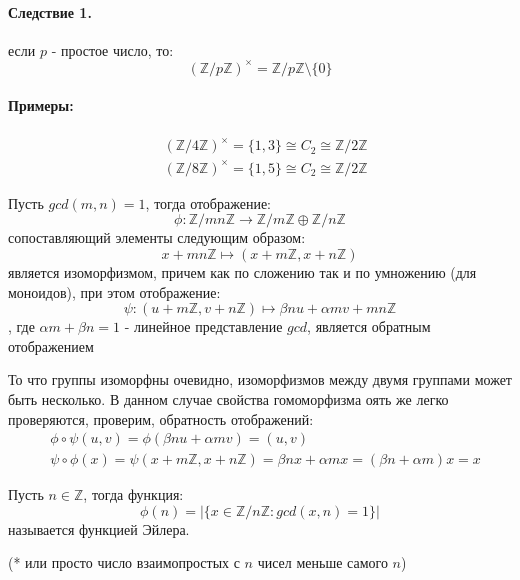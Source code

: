 \paragraph{Следствие 1.} если $p$ - простое число, то:
\[
	\left(\mathbb{Z} / {p \mathbb{Z}}\right)^{\times} = \mathbb{Z} / {p \mathbb{Z}} \setminus \{0\}
\]

\paragraph{Примеры:}
\[
	\begin{split}
		& \left(\mathbb{Z} / {4 \mathbb{Z}}\right)^{\times} = \{1, 3\} \cong C_2 \cong \mathbb{Z} / {2 \mathbb{Z}} \\
		& \left(\mathbb{Z} / {8 \mathbb{Z}}\right)^{\times} = \{1, 5\} \cong C_2 \cong \mathbb{Z} / {2 \mathbb{Z}}
	\end{split}
\]

\begin{Th}
Пусть $gcd\left(m,n\right) = 1$, тогда отображение:
\[
	\phi : \mathbb{Z} / {mn \mathbb{Z}} \rightarrow \mathbb{Z}/ {m \mathbb{Z}} \oplus \mathbb{Z} / {n \mathbb{Z}}
\]
сопоставляющий элементы следующим образом:
\[
	x + mn \mathbb{Z} \mapsto \left(x + m \mathbb{Z}, x + n \mathbb{Z}\right)
\]
является изоморфизмом, причем как по сложению так и по умножению (для моноидов), при этом отображение:
\[
	\psi: \left(u + m\mathbb{Z}, v + n\mathbb{Z}\right) \mapsto \beta n u + \alpha m v + mn \mathbb{Z}
\]
, где $\alpha m + \beta n = 1$ - линейное представление $gcd$, является обратным отображением
\end{Th}

\begin{Proof}
То что группы изоморфны очевидно, изоморфизмов между двумя группами может быть несколько. В данном случае свойства гомоморфизма оять же легко проверяются, проверим, обратность отображений:
\[
	\begin{split}
		& \phi \circ \psi \left(u,v\right) = \phi \left(\beta n u + \alpha m v\right) = \left(u, v\right) \\
		& \psi \circ \phi \left(x\right) = \psi \left(x + m \mathbb{Z}, x + n \mathbb{Z}\right) = \beta n x + \alpha m x = \left(\beta n + \alpha m\right) x = x
	\end{split}
\]
\end{Proof}

\begin{Def}
Пусть $n \in \mathbb{Z}$, тогда функция:
\[
	\phi \left(n\right) = \left|\{x \in \mathbb{Z}/{n \mathbb{Z}} : gcd\left(x, n\right) = 1\}\right|
\]
называется функцией Эйлера.
\end{Def}
(* или просто число взаимопростых с $n$ чисел меньше самого $n$)

